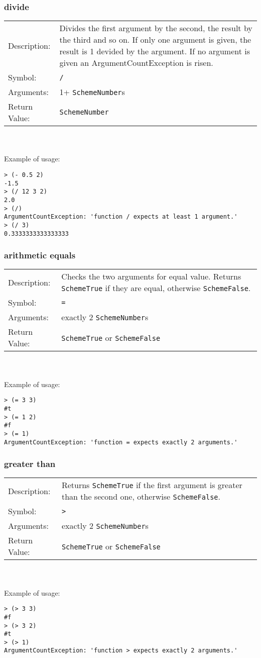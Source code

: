 \documentclass[12pt,a4paper]{scrartcl}
\begin{document}
\subsubsection*{divide}
\begin{tabular}{l  p{13cm}}
Description: & Divides the first argument by the second, the result by the third and so on. If only one argument is given, the result is 1 devided by the argument. If no argument is given an ArgumentCountException is risen.\\
Symbol: & \lstinline{/}\\
Arguments: & 1+ \lstinline{SchemeNumber}s\\
Return Value: & \lstinline{SchemeNumber}
\end{tabular}
\\
\\
Example of usage:
\begin{lstlisting}
> (- 0.5 2)
-1.5
> (/ 12 3 2)
2.0
> (/)
ArgumentCountException: 'function / expects at least 1 argument.'
> (/ 3)
0.3333333333333333
\end{lstlisting}

\subsubsection*{arithmetic equals}
\begin{tabular}{l  p{13cm}}
Description: & Checks the two arguments for equal value. Returns \lstinline{SchemeTrue} if they are equal, otherwise \lstinline{SchemeFalse}. \\
Symbol: & \lstinline{=}\\
Arguments: & exactly 2 \lstinline{SchemeNumber}s\\
Return Value: & \lstinline{SchemeTrue} or \lstinline{SchemeFalse}
\end{tabular}
\\
\\
Example of usage:
\begin{lstlisting}
> (= 3 3)
#t
> (= 1 2)
#f
> (= 1)
ArgumentCountException: 'function = expects exactly 2 arguments.'
\end{lstlisting}


\subsubsection*{greater than}
\begin{tabular}{l  p{13cm}}
Description: & Returns \lstinline{SchemeTrue} if the first argument is greater than the second one, otherwise \lstinline{SchemeFalse}. \\
Symbol: & \lstinline{>}\\
Arguments: & exactly 2 \lstinline{SchemeNumber}s\\
Return Value: & \lstinline{SchemeTrue} or \lstinline{SchemeFalse}
\end{tabular}
\\
\\
Example of usage:
\begin{lstlisting}
> (> 3 3)
#f
> (> 3 2)
#t
> (> 1)
ArgumentCountException: 'function > expects exactly 2 arguments.'
\end{lstlisting}
\end{document}

